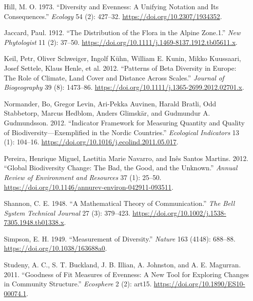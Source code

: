 \documentclass[
  12pt,
  oneside]{report}
\begin{document}
\leavevmode\hypertarget{ref-hill_diversity_1973}{}%
Hill, M. O. 1973. ``Diversity and Evenness: A Unifying Notation and Its Consequences.'' \emph{Ecology} 54 (2): 427--32. \url{https://doi.org/10.2307/1934352}.

\leavevmode\hypertarget{ref-jaccard_distribution_1912}{}%
Jaccard, Paul. 1912. ``The Distribution of the Flora in the Alpine Zone.1.'' \emph{New Phytologist} 11 (2): 37--50. \url{https://doi.org/10.1111/j.1469-8137.1912.tb05611.x}.

\leavevmode\hypertarget{ref-keil_patterns_2012}{}%
Keil, Petr, Oliver Schweiger, Ingolf Kühn, William E. Kunin, Mikko Kuussaari, Josef Settele, Klaus Henle, et al. 2012. ``Patterns of Beta Diversity in Europe: The Role of Climate, Land Cover and Distance Across Scales.'' \emph{Journal of Biogeography} 39 (8): 1473--86. \url{https://doi.org/10.1111/j.1365-2699.2012.02701.x}.

\leavevmode\hypertarget{ref-normander_indicator_2012}{}%
Normander, Bo, Gregor Levin, Ari-Pekka Auvinen, Harald Bratli, Odd Stabbetorp, Marcus Hedblom, Anders Glimskär, and Gudmundur A. Gudmundsson. 2012. ``Indicator Framework for Measuring Quantity and Quality of Biodiversity---Exemplified in the Nordic Countries.'' \emph{Ecological Indicators} 13 (1): 104--16. \url{https://doi.org/10.1016/j.ecolind.2011.05.017}.

\leavevmode\hypertarget{ref-pereira_global_2012}{}%
Pereira, Henrique Miguel, Laetitia Marie Navarro, and Inês Santos Martins. 2012. ``Global Biodiversity Change: The Bad, the Good, and the Unknown.'' \emph{Annual Review of Environment and Resources} 37 (1): 25--50. \url{https://doi.org/10.1146/annurev-environ-042911-093511}.

\leavevmode\hypertarget{ref-shannon_mathematical_1948}{}%
Shannon, C. E. 1948. ``A Mathematical Theory of Communication.'' \emph{The Bell System Technical Journal} 27 (3): 379--423. \url{https://doi.org/10.1002/j.1538-7305.1948.tb01338.x}.

\leavevmode\hypertarget{ref-simpson_measurement_1949}{}%
Simpson, E. H. 1949. ``Measurement of Diversity.'' \emph{Nature} 163 (4148): 688--88. \url{https://doi.org/10.1038/163688a0}.

\leavevmode\hypertarget{ref-studeny_goodness_2011}{}%
Studeny, A. C., S. T. Buckland, J. B. Illian, A. Johnston, and A. E. Magurran. 2011. ``Goodness of Fit Measures of Evenness: A New Tool for Exploring Changes in Community Structure.'' \emph{Ecosphere} 2 (2): art15. \url{https://doi.org/10.1890/ES10-00074.1}.
\end{document}
